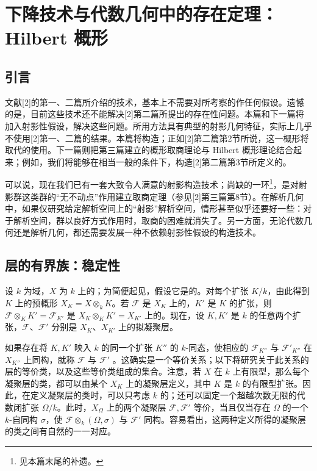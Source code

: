 \chapter{下降技术与代数几何中的存在定理：Hilbert 概形}

\section*{引言}
文献[2]的第一、二篇所介绍的技术，基本上不需要对所考察的作任何假设。遗憾的是，目前这些技术还不能解决[2]第二篇所提出的存在性问题。本篇和下一篇将加入射影性假设，解决这些问题。所用方法具有典型的射影几何特征，实际上几乎不使用[2]第一、二篇的结果。本篇将构造；正如[2]第二篇第2节所说，这一概形将取代的使用。下一篇则把第三篇建立的概形取商理论与 Hilbert 概形理论结合起来；例如，我们将能够在相当一般的条件下，构造[2]第二篇第3节所定义的。

可以说，现在我们已有一套大致令人满意的射影构造技术；尚缺的一环\footnote{见本篇末尾的补遗。}，是对射影群这类群的“无不动点”作用建立取商定理（参见[2]第三篇第8节）。在解析几何中，如果仅研究给定解析空间上的“射影”解析空间，情形甚至似乎还要好一些：对于解析空间，群以良好方式作用时，取商的困难就消失了。另一方面，无论代数几何还是解析几何，都还需要发展一种不依赖射影性假设的构造技术。

\section{层的有界族：稳定性}
设 $k$ 为域，$X$ 为 $k$ 上的；为简便起见，假设它是的。对每个扩张 $K/k$，由此得到 $K$ 上的预概形 $X_K=X\otimes_k K$。若 $\mathcal F$ 是 $X_K$ 上的，$K'$ 是 $K$ 的扩张，则 $\mathcal F\otimes_K K'=\mathcal F_{K'}$ 是 $X_K\otimes_K K'=X_{K'}$ 上的。现在，设 $K,K'$ 是 $k$ 的任意两个扩张，$\mathcal F$、$\mathcal F'$ 分别是 $X_K$、$X_{K'}$ 上的拟凝聚层。

如果存在将 $K,K'$ 映入 $k$ 的同一个扩张 $K''$ 的 $k$-同态，使相应的 $\mathcal F_{K''}$ 与 $\mathcal F'_{K''}$ 在 $X_{K''}$ 上同构，就称 $\mathcal F$ 与 $\mathcal F'$ 。这确实是一个等价关系；以下将研究关于此关系的层的等价类，以及这些等价类组成的集合。注意，若 $X$ 在 $k$ 上有限型，那么每个凝聚层的类，都可以由某个 $X_K$ 上的凝聚层定义，其中 $K$ 是 $k$ 的有限型扩张。因此，在定义凝聚层的类时，可以只考虑 $k$ 的；还可以固定一个超越次数无限的代数闭扩张 $\Omega/k$。此时，$X_\Omega$ 上的两个凝聚层 $\mathcal F,\mathcal F'$ 等价，当且仅当存在 $\Omega$ 的一个 $k$-自同构 $\sigma$，使 $\mathcal F\otimes_k(\Omega,\sigma)$ 与 $\mathcal F'$ 同构。容易看出，这两种定义所得的凝聚层的类之间有自然的一一对应。

